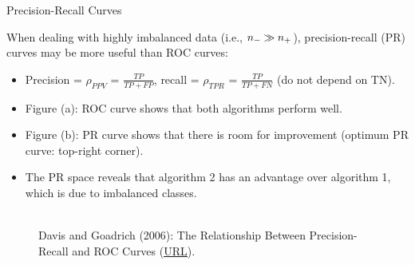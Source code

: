 \begin{vbframe}{Precision-Recall Curves}


\begin{footnotesize}

When dealing with highly imbalanced data (i.e., $n_{-} \gg n_{+}$), precision-recall
(PR) curves may be more useful than ROC curves:

\begin{itemize}
  \item Precision = $\rho_{PPV}$ = $\frac{TP}{TP + FP}$, recall = $\rho_{TPR}$ = $\frac{TP}{TP + FN}$
  (do not depend on TN).
  \item Figure (a): ROC curve shows that both algorithms perform well.
  \item Figure (b): PR curve shows that there is room for improvement (optimum
  PR curve: top-right corner).
  \item The PR space reveals that algorithm 2 has an advantage over algorithm 1,
  which is due to imbalanced classes.
\end{itemize}

\end{footnotesize}

\begin{figure}
  \centering
  \tiny
  \\Davis and Goadrich (2006): The Relationship Between Precision-Recall and
  ROC Curves (\href{https://www.biostat.wisc.edu/~page/rocpr.pdf}
  {\underline{URL}}).
\end{figure}


\end{vbframe}
